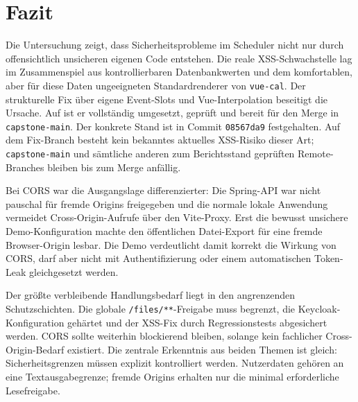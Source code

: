 \section{Fazit}
\label{sec:fazit}

Die Untersuchung zeigt, dass Sicherheitsprobleme im Scheduler nicht
nur durch offensichtlich unsicheren eigenen Code entstehen. Die reale
XSS-Schwachstelle lag im Zusammenspiel aus kontrollierbaren
Datenbankwerten und dem komfortablen, aber für diese Daten
ungeeigneten Standardrenderer von \texttt{vue-cal}. Der strukturelle
Fix über eigene Event-Slots und Vue-Interpolation beseitigt die
Ursache. Auf  ist er vollständig
umgesetzt, geprüft und bereit für den Merge in \texttt{capstone-main}.
Der konkrete Stand ist in Commit \texttt{08567da9} festgehalten. Auf
dem Fix-Branch besteht kein bekanntes aktuelles XSS-Risiko dieser Art;
\texttt{capstone-main} und sämtliche anderen zum Berichtsstand
geprüften Remote-Branches bleiben bis zum Merge anfällig.

Bei CORS war die Ausgangslage differenzierter: Die Spring-API war
nicht pauschal für fremde Origins freigegeben und die normale lokale
Anwendung vermeidet Cross-Origin-Aufrufe über den Vite-Proxy. Erst
die bewusst unsichere Demo-Konfiguration machte den öffentlichen
Datei-Export für eine fremde Browser-Origin lesbar. Die Demo
verdeutlicht damit korrekt die Wirkung von CORS, darf aber nicht mit
Authentifizierung oder einem automatischen Token-Leak gleichgesetzt werden.

Der größte verbleibende Handlungsbedarf liegt in den angrenzenden
Schutzschichten. Die globale \texttt{/files/**}-Freigabe muss
begrenzt, die Keycloak-Konfiguration gehärtet und der XSS-Fix durch
Regressionstests abgesichert werden. CORS sollte weiterhin
blockierend bleiben, solange kein fachlicher Cross-Origin-Bedarf
existiert. Die zentrale Erkenntnis aus beiden Themen ist gleich:
Sicherheitsgrenzen müssen explizit kontrolliert werden. Nutzerdaten
gehören an eine Textausgabegrenze; fremde Origins erhalten nur die
minimal erforderliche Lesefreigabe.
